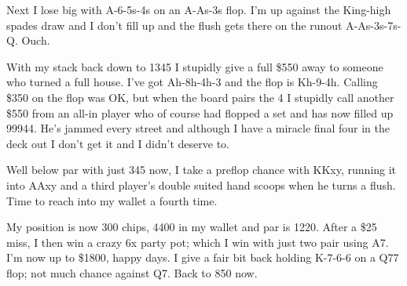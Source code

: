 Next I lose big with A-6-5s-4s on an A-As-3s flop. I'm up against the
King-high spades draw and I don't fill up and the flush gets there on
the runout A-As-3s-7s-Q. Ouch.

With my stack back down to 1345 I stupidly give a full \$550 away to
someone who turned a full house. I've got Ah-8h-4h-3 and the flop is
Kh-9-4h. Calling \$350 on the flop was OK, but when the board pairs
the 4 I stupidly call another \$550 from an all-in player who of
course had flopped a set and has now filled up 99944. He's jammed
every street and although I have a miracle final four in the deck out
I don't get it and I didn't deserve to.

Well below par with just 345 now, I take a preflop chance with KKxy,
running it into AAxy and a third player's double suited hand scoops
when he turns a flush. Time to reach into my wallet a fourth time.

My position is now 300 chips, 4400 in my wallet and par is 1220.
After a \$25 miss, I then win a crazy 6x party pot; which I win with
just two pair using A7. I'm now up to \$1800, happy days. I give
a fair bit back holding K-7-6-6 on a Q77 flop; not much chance against
Q7. Back to 850 now.

